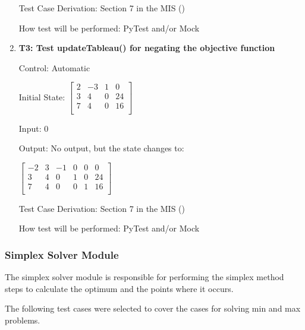 \documentclass[12pt, titlepage]{article}
\begin{document}
\begin{enumerate}
	Test Case Derivation: Section 7 in the MIS (\cite{losms-mis})
	
	How test will be performed: PyTest and/or Mock
	
	\item{\textbf{T3: Test updateTableau() for negating the objective function}}
	
	Control: Automatic 
	
	Initial State: $\begin{bmatrix}
	2 & -3 & 1 & 0\\
	3 & 4 & 0 & 24\\
	7 & 4 & 0 & 16\\
	\end{bmatrix}$
	
	Input: 0
	
	Output: No output, but the state changes to:
	
	$\begin{bmatrix}
	-2 & 3 & -1 & 0 & 0 & 0\\
	3 & 4 & 0 & 1 & 0 & 24\\
	7 & 4 & 0 & 0 & 1 & 16\\
	\end{bmatrix}$
	
	Test Case Derivation: Section 7 in the MIS (\cite{losms-mis})
	
	How test will be performed: PyTest and/or Mock
	

\end{enumerate}

\subsubsection{Simplex Solver Module}

The simplex solver module is responsible for performing the simplex method 
steps to calculate the optimum and the points where it occurs.

The following test cases were selected to cover the cases for solving min and 
max problems.
\end{document}
